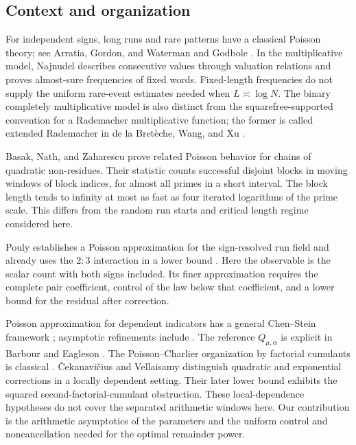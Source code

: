 \subsection{Context and organization}

For independent signs, long runs and rare patterns have a classical
Poisson theory; see Arratia, Gordon, and Waterman \cite{agw1990}
and Godbole \cite{godbole1991}. In the multiplicative model,
Najnudel \cite[Lemma~3.1 and Proposition~6.3]{najnudel2020}
describes consecutive values through valuation relations and proves
almost-sure frequencies of fixed words. Fixed-length frequencies do
not supply the uniform rare-event estimates needed when
\(L\asymp\log N\). The binary completely multiplicative model is
also distinct from the squarefree-supported convention for a
Rademacher multiplicative function; the former is called extended
Rademacher in de la Bret\`eche, Wang, and Xu \cite{bretwngxu2026}.

Basak, Nath, and Zaharescu
\cite[Theorem~1]{basaknathzaharescu2024} prove related Poisson behavior
for chains of quadratic non-residues. Their statistic counts successful
disjoint blocks in moving windows of block indices, for almost all primes
in a short interval. The block length tends to infinity at most as fast
as four iterated logarithms of the prime scale. This differs from the
random run starts and critical length regime considered here.

Pouly \cite[Theorem~1.1]{pouly2026c} establishes a Poisson
approximation for the sign-resolved run field and already uses the \(2:3\)
interaction in a lower bound \cite[Section~3.6, (3.22)]{pouly2026c}.
Here the observable is the scalar count with both signs included.
Its finer approximation requires the complete pair coefficient,
control of the law below that coefficient, and a lower bound
for the residual after correction.

Poisson approximation for dependent indicators has a general
Chen--Stein framework \cite{agg1989}; asymptotic refinements include
\cite{barbour1987,barboureagleson1987}.
The reference \(Q_{\mu,\alpha}\) is explicit in Barbour and Eagleson
\cite[Theorem~1, p.~588]{barboureagleson1987}.
The Poisson--Charlier organization by factorial cumulants is classical
\cite[Sections~5 and~8.1]{bkn2014}.
\v{C}ekanavi\v{c}ius and Vellaisamy
\cite[Theorems~3.1--3.2]{cekanaviciusvellaisamy2015} distinguish
quadratic and exponential corrections in a locally dependent setting.
Their later lower bound
\cite[Theorem~2.1, (2.3)]{cekanaviciusvellaisamy2020}
exhibits the squared second-factorial-cumulant obstruction.
These local-dependence hypotheses do not cover the separated arithmetic
windows here. Our contribution is the arithmetic asymptotics of the
parameters and the uniform control and noncancellation needed for the
optimal remainder power.

